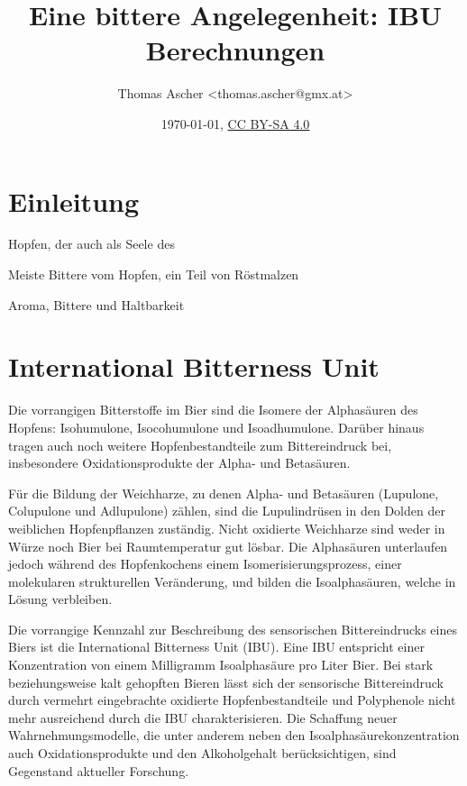 \documentclass[a4paper,parskip=half]{scrartcl}
\title{Eine bittere Angelegenheit: IBU Berechnungen}
\author{Thomas Ascher <thomas.ascher@gmx.at>}
\date{\today, \href{http://creativecommons.org/licenses/by-sa/4.0/}{CC BY-SA 4.0}}
\begin{document}
\maketitle

\section*{Einleitung}

Hopfen, der auch als Seele des 

\parencite{Bastgen2020}

Meiste Bittere vom Hopfen, ein Teil von Röstmalzen \parencite[11]{Garetz1994}

\parencite[10]{Garetz1994}
Aroma, Bittere und Haltbarkeit

\section*{International Bitterness Unit}

Die vorrangigen Bitterstoffe im Bier sind die Isomere der Alphasäuren des Hopfens: Isohumulone, Isocohumulone und Isoadhumulone. Darüber hinaus tragen auch noch weitere Hopfenbestandteile zum Bittereindruck bei, insbesondere Oxidationsprodukte der Alpha- und Betasäuren. \parencite{MEBAK2020}

Für die Bildung der Weichharze, zu denen Alpha- und Betasäuren (Lupulone, Colupulone und Adlupulone) zählen, sind die Lupulindrüsen in den Dolden der weiblichen Hopfenpflanzen zuständig. Nicht oxidierte Weichharze sind weder in Würze noch Bier bei Raumtemperatur gut lösbar. Die Alphasäuren unterlaufen jedoch während des Hopfenkochens einem Isomerisierungsprozess, einer molekularen strukturellen Veränderung, und bilden die Isoalphasäuren, welche in Lösung verbleiben. \parencite{Hall1997}

Die vorrangige Kennzahl zur Beschreibung des sensorischen Bittereindrucks eines Biers ist die International Bitterness Unit (IBU). Eine IBU entspricht einer Konzentration von einem Milligramm Isoalphasäure pro Liter Bier. Bei stark beziehungsweise kalt gehopften Bieren lässt sich der sensorische Bittereindruck durch vermehrt eingebrachte oxidierte Hopfenbestandteile und Polyphenole nicht mehr ausreichend durch die IBU charakterisieren. Die Schaffung neuer Wahrnehmungsmodelle, die unter anderem neben den Isoalphasäurekonzentration auch Oxidationsprodukte und den Alkoholgehalt berücksichtigen, sind Gegenstand  aktueller Forschung. \parencite{Kishimoto2021}
\end{document}
